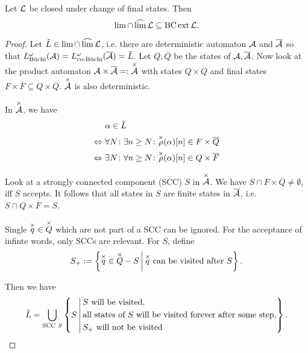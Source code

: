 \begin{theorem}
\label{gen:staiger-wagner:limInExt}
Let $\mathcal{L}$ be closed under change of final states. Then
\[ \lim \cap \operatorname{\widehat{lim}} \mathcal{L} \subseteq \operatorname{BC} \operatorname{ext} \mathcal{L} . \]

\begin{proof}
Let $\tilde L \in \lim \cap \operatorname{\widehat{lim}} \mathcal{L}$, i.e. there are deterministic automaton $\mathcal{A}$ and $\overline {\mathcal{A}}$ so that $L^\omega_{\text{Büchi}}(\mathcal{A}) = L^\omega_{\text{co-Büchi}}(\overline {\mathcal{A}}) = \tilde L$. Let $Q,\overline Q$ be the states of $\mathcal{A},\overline {\mathcal{A}}$. Now look at the product automaton $\mathcal{A} \times \overline {\mathcal{A}} =: \overset{\times}{\mathcal{A}}$ with states $Q \times \overline Q$ and final states $F \times \overline F \subseteq Q \times \overline Q$. $\overset{\times}{\mathcal{A}}$ is also deterministic.



In $\overset{\times}{\mathcal{A}}$, we have
\begin{align*}
& \alpha \in \tilde L \\
\Leftrightarrow \ & \forall N \colon \exists n \ge N \colon \overset{\times}{\rho}(\alpha)[n] \in F \times \overline Q \\
\Leftrightarrow \ & \exists N \colon \forall n \ge N \colon \overset{\times}{\rho}(\alpha)[n] \in Q \times \overline F
\end{align*}

Look at a strongly connected component (SCC) $S$ in $\overset{\times}{\mathcal{A}}$. We have $S \cap F \times \overline Q \neq \emptyset$, iff $S$ accepts. It follows that all states in $S$ are finite states in $\overline {\mathcal{A}}$, i.e. $S \cap Q \times \overline F = S$.

Single $\overset{\times}{q} \in \overset{\times}{Q}$ which are not part of a SCC can be ignored. For the acceptance of infinte words, only SCCs are relevant. For $S$, define
\[ S_+ := \Set{\overx{q} \in \overx{Q}-S}{\overx{q} \text{ can be visited after } S} . \]

Then we have
\[
\tilde L = \bigcup_{\text{SCC $S$}} \Set{S}{
\begin{aligned}
&\text{$S$ will be visited}, \\
&\text{all states of $S$ will be visited forever after some step}, \\
&\text{$S_+$ will not be visited}
\end{aligned}
} .
\]


\end{proof}
\end{theorem}
